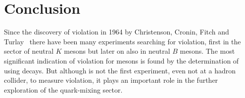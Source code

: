 
\chapter{Conclusion}
\label{sec:conclusion}

Since the discovery of \CP violation in 1964 by Christenson, Cronin, Fitch and
Turlay~\cite{CPV_discovery} there have been many experiments searching for \CP
violation, first in the sector of neutral $K$ mesons but later on also in
neutral $B$ mesons. The most significant indication of \CP violation for \Bz
mesons is found by the determination of \sintwobeta using \BdToJPsiKS decays.
But although \lhcb is not the first experiment, even not at a hadron collider,
to measure \CP violation, it plays an important role in the further exploration
of the quark-mixing sector.

